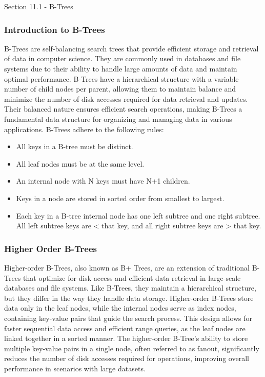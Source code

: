 \begin{notes}{Section 11.1 - B-Trees}
    \subsubsection*{Introduction to B-Trees}

    B-Trees are self-balancing search trees that provide efficient storage and retrieval of data in computer science. They are commonly used in databases and file systems due to their ability to handle large amounts of data and maintain optimal performance. B-Trees have a hierarchical structure with a variable number of child nodes per parent, 
    allowing them to maintain balance and minimize the number of disk accesses required for data retrieval and updates. Their balanced nature ensures efficient search operations, making B-Trees a fundamental data structure for organizing and managing data in various applications. B-Trees adhere to the following rules:
    
    \begin{itemize}
        \item All keys in a B-tree must be distinct.
        \item All leaf nodes must be at the same level.
        \item An internal node with N keys must have N+1 children.
        \item Keys in a node are stored in sorted order from smallest to largest.
        \item Each key in a B-tree internal node has one left subtree and one right subtree. All left subtree keys are < that key, and all right subtree keys are > that key.
    \end{itemize}
    
    \subsubsection*{Higher Order B-Trees}
    
    Higher-order B-Trees, also known as B+ Trees, are an extension of traditional B-Trees that optimize for disk access and efficient data retrieval in large-scale databases and file systems. Like B-Trees, they maintain a hierarchical structure, but they differ in the way they handle data storage. Higher-order B-Trees store data only in the leaf 
    nodes, while the internal nodes serve as index nodes, containing key-value pairs that guide the search process. This design allows for faster sequential data access and efficient range queries, as the leaf nodes are linked together in a sorted manner. The higher-order B-Tree's ability to store multiple key-value pairs in a single node, often referred 
    to as fanout, significantly reduces the number of disk accesses required for operations, improving overall performance in scenarios with large datasets.
    

\end{notes}
